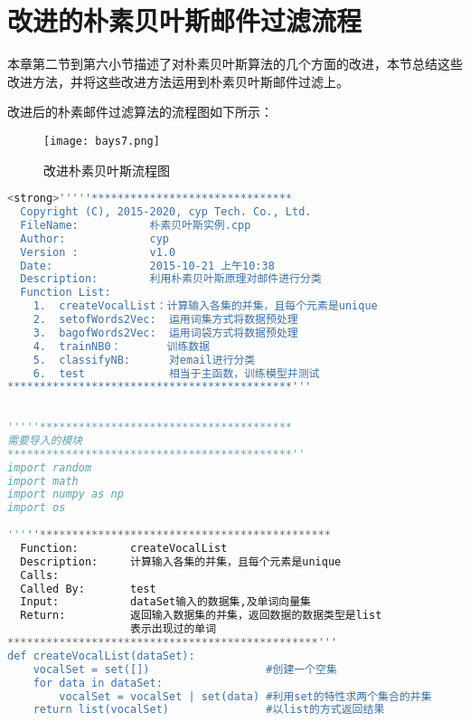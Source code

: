 \section{改进的朴素贝叶斯邮件过滤流程}
本章第二节到第六小节描述了对朴素贝叶斯算法的几个方面的改进，本节总结这些改进方法，并将这些改进方法运用到朴素贝叶斯邮件过滤上。 

改进后的朴素邮件过滤算法的流程图如下所示：
\begin{figure}[htbp]
\centering
\texttt{[image: bays7.png]}
\caption{改进朴素贝叶斯流程图}
\label{fig:logo}
\end{figure}

\newpage

\begin{lstlisting}[language=python]
<strong>'''''******************************* 
  Copyright (C), 2015-2020, cyp Tech. Co., Ltd. 
  FileName:           朴素贝叶斯实例.cpp 
  Author:             cyp      
  Version :           v1.0           
  Date:               2015-10-21 上午10:38 
  Description:        利用朴素贝叶斯原理对邮件进行分类      
  Function List:       
    1.  createVocalList：计算输入各集的并集，且每个元素是unique 
    2.  setofWords2Vec:  运用词集方式将数据预处理 
    3.  bagofWords2Vec:  运用词袋方式将数据预处理 
    4.  trainNB0：       训练数据 
    5.  classifyNB:      对email进行分类 
    6.  test             相当于主函数，训练模型并测试 
********************************************'''  
  
  
'''''*************************************** 
需要导入的模块 
********************************************''  
import random  
import math  
import numpy as np  
import os  
  
'''''********************************************* 
  Function:        createVocalList 
  Description:     计算输入各集的并集，且每个元素是unique 
  Calls:            
  Called By:       test 
  Input:           dataSet输入的数据集,及单词向量集 
  Return:          返回输入数据集的并集，返回数据的数据类型是list 
                   表示出现过的单词 
************************************************'''  
def createVocalList(dataSet):  
    vocalSet = set([])                  #创建一个空集  
    for data in dataSet:  
        vocalSet = vocalSet | set(data) #利用set的特性求两个集合的并集  
    return list(vocalSet)               #以list的方式返回结果  
      

\end{lstlisting}
